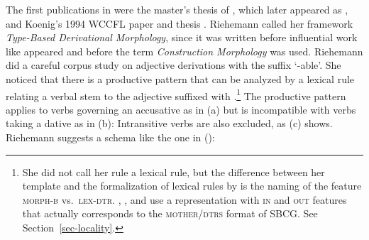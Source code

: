 \documentclass[output=paper,biblatex,babelshorthands,newtxmath,draftmode,colorlinks,citecolor=brown]{langscibook}
\begin{document}
\largerpage\enlargethispage{5pt}
The first publications in  were the
master's thesis of \citet{Riehemann93a}, which later appeared as \citet{Riehemann98a}, and Koenig's
1994 WCCFL paper and thesis
\citep{KJ95a-u,Koenig94a-u,Koenig99a}. Riehemann called her framework \emph{Type-Based Derivational
  Morphology}, since it was written before influential work like 
appeared and before the term \emph{Construction Morphology} \citep{Booij2005a} was used. Riehemann did a careful corpus study on adjective
derivations with the suffix  `-able'. She noticed that there is a productive pattern
that can be analyzed by a lexical rule relating a verbal stem to the adjective suffixed with
.\footnote{
  She did not call her rule a lexical rule, but the difference between her template and the
  formalization of lexical rules by \citet[]{Mueller2002b} is the naming of the feature \textsc{morph-b}
  vs.\ \textsc{lex-dtr}. \citet[Section~8.2.3]{CB92a}, \citet[Section~2]{BC99a}, and \citet[]{Meurers2001a} use a representation with
  \textsc{in} and \textsc{out} features that actually corresponds to the
  \textsc{mother}/\textsc{dtrs} format of SBCG. See Section~\ref{sec-locality}.
} The productive pattern applies to verbs governing an accusative as in (a) but
is incompatible with verbs taking a dative as in (b):
\eal
{}
\zl
Intransitive verbs are also excluded, as (c) shows. Riehemann suggests a schema like the one in
():
\end{document}
